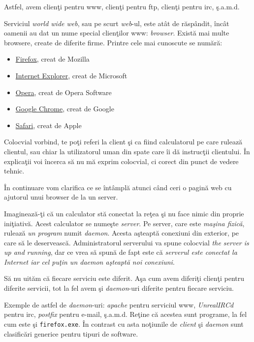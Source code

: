Astfel, avem clienţi pentru www, clienţi pentru ftp, clienţi pentru irc, ş.a.m.d.

Serviciul \textit{world wide web}, sau pe scurt \textit{web}-ul, este atât de răspândit, încât
oamenii au dat un nume special clienţilor www: \textsl{browser}. Există mai multe browsere,
create de diferite firme. Printre cele mai cunoscute se numără:
\begin{itemize}
\item \href{http://en.wikipedia.org/wiki/Firefox}{Firefox}, creat de Mozilla
\item \href{http://en.wikipedia.org/wiki/Internet_explorer}{Internet Explorer}, creat de Microsoft
\item \href{http://en.wikipedia.org/wiki/Opera_(web_browser)}{Opera}, creat de Opera Software
\item \href{http://en.wikipedia.org/wiki/Chrome_(web_browser)}{Google Chrome}, creat de Google
\item \href{http://en.wikipedia.org/wiki/Safari_(browser)}{Safari}, creat de Apple
\end{itemize}

Colocvial vorbind, te poţi referi la client şi
ca fiind calculatorul pe care rulează clientul, sau chiar la utilizatorul uman din spate
care îi dă instrucţii clientului. În explicaţii voi încerca să nu mă exprim colocvial, ci
corect din punct de vedere tehnic.

În continuare vom clarifica ce se întâmplă atunci când ceri o pagină web cu ajutorul
unui browser de la un server.

Imaginează-ţi că un calculator stă conectat la reţea şi
nu face nimic din {\glqq}proprie iniţiativă{\grqq}.
Acest calculator se numeşte \textsl{server}. Pe server, care este
\textit{maşina fizică}, rulează \textit{un program} numit \textsl{daemon}.
Acesta aşteaptă conexiuni din
exterior, pe care să le deservească. Administratorul serverului va spune colocvial
\textit{the server is up and running}, dar ce vrea să spună de fapt este că \textit{serverul
este conectat la Internet iar cel puţin un daemon aşteaptă noi conexiuni}.

Să nu uităm că fiecare serviciu este diferit. Aşa cum avem diferiţi clienţi pentru
diferite servicii, tot la fel avem şi \textit{daemon}-uri diferite pentru fiecare serviciu.

Exemple de astfel de \textit{daemon}-uri: \textsl{apache} pentru serviciul
www, \textsl{UnrealIRCd} pentru irc,
\textsl{postfix} pentru e-mail, ş.a.m.d. Reţine că acestea sunt programe, la fel
cum este şi \texttt{firefox.exe}. În contrast cu asta noţiunile de \textit{client} şi
\textit{daemon} sunt clasificări
generice pentru tipuri de software.

